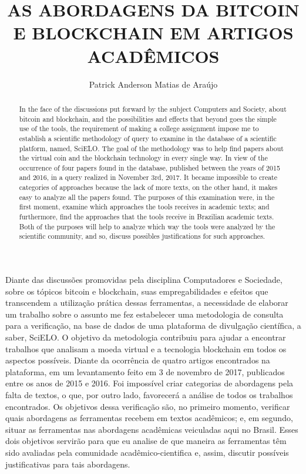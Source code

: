 \documentclass[12pt]{article}
\title{AS ABORDAGENS DA BITCOIN E BLOCKCHAIN EM ARTIGOS ACADÊMICOS}
\author{Patrick Anderson Matias de Araújo\inst{1}}
\begin{document}
 

\maketitle
     
\begin{resumo} 
  Diante das discussões promovidas pela disciplina Computadores e Sociedade, sobre os tópicos bitcoin e blockchain, suas empregabilidades e efeitos que transcendem a utilização prática dessas ferramentas, a necessidade de elaborar um trabalho sobre o assunto me fez estabelecer uma metodologia de consulta para a verificação, na base de dados de uma plataforma de divulgação científica, a saber, SciELO. O objetivo da metodologia contribuiu para ajudar a encontrar trabalhos que analisam a moeda virtual e a tecnologia blockchain em todos os aspectos possíveis. Diante da ocorrência de quatro artigos encontrados na plataforma, em um levantamento feito em 3 de novembro de 2017, publicados entre os anos de 2015 e 2016. Foi impossível criar categorias de abordagens pela falta de textos, o que, por outro lado, favorecerá a análise de todos os trabalhos encontrados. Os objetivos dessa verificação são, no primeiro momento, verificar quais abordagens as ferramentas recebem em textos acadêmicos; e, em segundo, situar as ferramentas nas abordagens acadêmicas veiculadas aqui no Brasil. Esses dois objetivos servirão para que eu analise de que maneira as ferramentas têm sido avaliadas pela comunidade acadêmico-cientifica e, assim, discutir possíveis justificativas para tais abordagens.
\end{resumo}

\begin{abstract}
In the face of the discussions put forward by the subject Computers and Society, about bitcoin and blockchain, and the possibilities and effects that beyond goes  the simple use of the tools, the requirement of making a college assignment impose me to establish a scientific methodology of query to examine in the database of a scientific platform, named, SciELO. The goal of the methodology was to help find papers about the virtual coin and the blockchain technology in every single way. In view of the occurrence of four papers found in the database, published between the years of 2015 and 2016, in a query realized in November 3rd, 2017. It became impossible to create categories of approaches because the lack of more texts, on the other hand, it makes easy to analyze all the papers found. The purposes of this examination were, in the first moment, examine which approaches the tools receives in academic texts; and furthermore, find the approaches that the tools receive in Brazilian academic texts. Both of the purposes will help to analyze which way the tools were analyzed by the scientific community, and so, discuss possibles justifications for such approaches.
\end{abstract}
\end{document}
